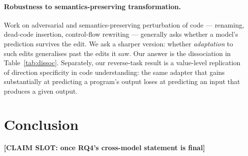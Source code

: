 \documentclass[sigconf,review,anonymous]{acmart}
\newcommand{\slot}[1]{\textbf{[CLAIM SLOT: #1]}}
\begin{document}
\paragraph{Robustness to semantics-preserving transformation.} Work on adversarial and
semantics-preserving perturbation of code --- renaming, dead-code insertion, control-flow rewriting
--- generally asks whether a model's prediction survives the edit. We ask a sharper version: whether
\emph{adaptation} to such edits generalises past the edits it saw. Our answer is the dissociation in
Table~\ref{tab:dissoc}. Separately, our reverse-task result is a value-level replication of
direction specificity in code understanding: the same adapter that gains substantially at predicting
a program's output loses at predicting an input that produces a given output.

\section{Conclusion}
\slot{once RQ4's cross-model statement is final}
\end{document}
